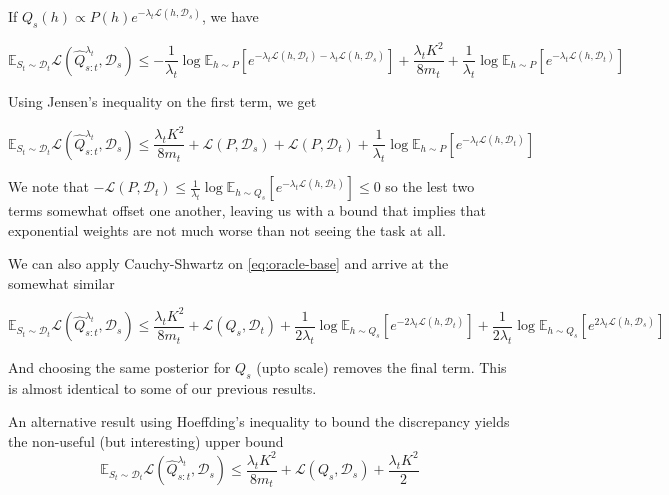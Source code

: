 \documentclass[letterpaper]{article}
\theoremstyle{definition}
\begin{document}
If $Q_s(h)\propto P(h)e^{-\lambda_t\mathcal{L}(h,\mathcal{D}_s)}$, we have 

\begin{equation*} 
\mathbb{E}_{S_t\sim \mathcal{D}_t}\mathcal{L}( \hat{Q}^{\lambda_t}_{s:t},\mathcal{D}_s)\leq -\frac{1}{\lambda_t}\log \mathbb{E}_{h\sim P}\left [e^{-\lambda_t\mathcal{L}(h,\mathcal{D}_t)-\lambda_t\mathcal{L}(h,\mathcal{D}_s)}\right ]+\frac{\lambda_t K^2}{8m_t}+\frac{1}{\lambda_t}\log\mathbb{E}_{h\sim P}\left [e^{-\lambda_t\mathcal{L}(h,\mathcal{D}_t)} \right ]
\end{equation*}

Using Jensen's inequality on the first term, we get

\begin{equation} 
\mathbb{E}_{S_t\sim \mathcal{D}_t}\mathcal{L}( \hat{Q}^{\lambda_t}_{s:t},\mathcal{D}_s)\leq \frac{\lambda_t K^2}{8m_t}+\mathcal{L}(P,\mathcal{D}_s)+\mathcal{L}(P,\mathcal{D}_t) +\frac{1}{\lambda_t}\log\mathbb{E}_{h\sim P}\left [e^{-\lambda_t\mathcal{L}(h,\mathcal{D}_t)} \right ]
\end{equation}

We note that $-\mathcal{L}(P,\mathcal{D}_t)\leq\frac{1}{\lambda_t}\log\mathbb{E}_{h\sim Q_s}\left [e^{-\lambda_t\mathcal{L}(h,\mathcal{D}_t)} \right ]\leq 0$ so the lest two terms somewhat offset one another, leaving us with a bound that implies that exponential weights are not much worse than not seeing the task at all.

We can also apply Cauchy-Shwartz on \eqref{eq:oracle-base} and arrive at the somewhat similar 

\begin{equation} 
\mathbb{E}_{S_t\sim \mathcal{D}_t}\mathcal{L}( \hat{Q}^{\lambda_t}_{s:t},\mathcal{D}_s)\leq \frac{\lambda_t K^2}{8m_t}+\mathcal{L}(Q_s,\mathcal{D}_t) +\frac{1}{2\lambda_t}\log\mathbb{E}_{h\sim Q_s}\left [e^{-2\lambda_t\mathcal{L}(h,\mathcal{D}_t)} \right ]+\frac{1}{2\lambda_t}\log\mathbb{E}_{h\sim Q_s}\left [e^{2\lambda_t\mathcal{L}(h,\mathcal{D}_s)} \right ]
\end{equation}

And choosing the same posterior for $Q_s$ (upto scale) removes the final term. This is almost identical to some of our previous results.

An alternative result using Hoeffding's inequality to bound the discrepancy yields the non-useful (but interesting) upper bound
\begin{equation} 
\mathbb{E}_{S_t\sim \mathcal{D}_t}\mathcal{L}( \hat{Q}^{\lambda_t}_{s:t},\mathcal{D}_s)\leq \frac{\lambda_t K^2}{8m_t}+\mathcal{L}(Q_s,\mathcal{D}_s)+\frac{\lambda_t K^2}{2}
\end{equation}
\end{document}
